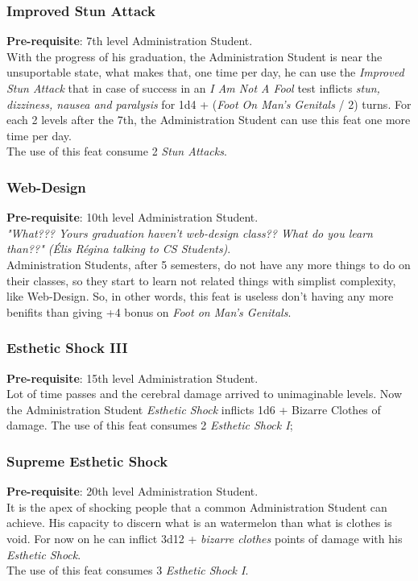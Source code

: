 \documentclass[ letterpaper,12pt]{article}
\begin{document}
\subsubsection{Improved Stun Attack}
 {\bf Pre-requisite}: 7th level Administration Student.\\
 With the progress of his graduation, the Administration Student is near the unsuportable state, what makes that, one time per day, he can use the {\it Improved Stun Attack} that in case of success in an {\it I Am Not A Fool} test inflicts {\it stun, dizziness, nausea and paralysis} for 1d4 + ({\it Foot On Man's Genitals} / 2) turns. For each 2 levels after the 7th, the Administration Student can use this feat one more time per day.\\
The use of this feat consume 2 {\it Stun Attacks}.

\subsubsection{Web-Design}
{\bf Pre-requisite}: 10th level Administration Student.\\
{\it "What??? Yours graduation haven't web-design class?? What do you learn than??" (Élis Régina talking to CS Students)}.\\
Administration Students, after 5 semesters, do not have any more things to do on their classes, so they start to learn not related things with simplist complexity, like Web-Design. So, in other words, this feat is useless don't having any more benifits than giving +4 bonus on {\it Foot on Man's Genitals}.

\subsubsection{Esthetic Shock III}
  {\bf Pre-requisite}: 15th level Administration Student.\\
Lot of time passes and the cerebral damage arrived to unimaginable levels. Now the Administration Student {\it Esthetic Shock} inflicts 1d6 + {Bizarre Clothes} of damage. The use of this feat consumes 2 {\it Esthetic Shock I};

\subsubsection{Supreme Esthetic Shock}
  {\bf Pre-requisite}: 20th level Administration Student.\\
It is the apex of shocking people that a common Administration Student can achieve. His capacity to discern what is an watermelon than what is clothes is void. For now on he can inflict 3d12 + {\it bizarre clothes} points of damage with his {\it Esthetic Shock}.\\
The use of this feat consumes 3 {\it Esthetic Shock I}.
\end{document}
